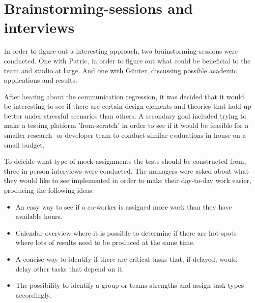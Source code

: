 \documentclass[nofilelist,dvipsnames]{cslthse-msc}
\begin{document}
		\section{Brainstorming-sessions and interviews}{\label{label_sectionIdeas}

      In order to figure out a interesting approach, two brainstorming-sessions
      were conducted. One with Patric, in order to figure out what could be
      beneficial to the team and studio at large. And one with Günter,
      discussing possible academic applications and results.

      After hearing about the communication regression, it was decided that
      it would be interesting to see if there are certain design elements and
      theories that hold up better under stressful scenarios than others. A
      secondary goal included trying to make a testing platform 'from-scratch'
      in order to see if it would be feasible for a smaller research- or
      developer-team to conduct similar evaluations in-house on a small budget.

      To deicide what type of mock-assignments the tests should be constructed
      from, three in-person interviews were conducted. The managers were asked
      about what they would like to see implemented in order to make their
      day-to-day work easier, producing the following ideas:

      \newcommand{\ideaOne}{%
        An easy way to see if a co-worker is assigned more work than they have
        available hours.%
      }

      \newcommand{\ideaTwo}{%
        Calendar overview where it is possible to determine if there are
        hot-spots where lots of results need to be produced at the same
        time.%
      }

      \newcommand{\ideaThree}{%
        A concise way to identify if there are critical tasks that, if
        delayed, would delay other tasks that depend on it.%
      }

      \newcommand{\ideaFour}{%
        The possibility to identify a group or teams strengths and assign
        task types accordingly.%
      }

      \begin{itemize}
        \item{\ideaOne\label{label_ideas}}
        \item{\ideaTwo}
        \item{\ideaThree}
        \item{\ideaFour}
      \end{itemize}


}
\end{document}
